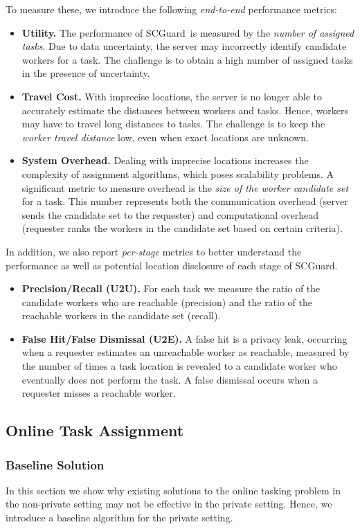 \documentclass{USC-Thesis}
\renewcommand\bf\bfseries
\newcommand{\SCG}{{SCGuard}}
\numberwithin{equation}{chapter}
\begin{document}
To measure these, we introduce the following \emph{end-to-end} performance metrics:
\begin{itemize}
\item
{\bf Utility.} The performance of \SCG\ is measured by the \emph{number of assigned tasks}.
Due to data uncertainty, the server may incorrectly identify candidate workers for a task. The challenge is to obtain a high number of assigned tasks in the presence of uncertainty.
\item
{\bf Travel Cost.} 
With imprecise locations, the server is no longer able to accurately estimate the distances between workers and tasks. Hence, workers may have to travel long distances to tasks. The challenge is to keep the \emph{worker travel distance} low, even when exact locations are unknown.
\item
{\bf System Overhead.} Dealing with imprecise locations increases the complexity of assignment algorithms, which
poses scalability problems. A significant metric to measure overhead is the \emph{size of the worker candidate set} for a task. This number represents both the communication overhead (server sends the candidate set to the requester) and computational overhead (requester ranks the workers in the candidate set based on certain criteria).
\end{itemize}

In addition, we also report \emph{per-stage} metrics to better understand the performance as well as potential location disclosure of each stage of \SCG.
\begin{itemize}
\item
{\bf Precision/Recall (U2U).} For each task we measure the ratio of the candidate workers who are reachable (precision) and the ratio of the reachable workers in the candidate set (recall).
\item
{\bf False Hit/False Dismissal (U2E).} A false hit is a privacy leak, occurring when a requester estimates an unreachable worker as reachable, measured by the number of times a task location is revealed to a candidate worker who eventually does not perform the task.
A false dismissal occurs when a requester misses a reachable worker.
\end{itemize}

\subsection{Online Task Assignment}
\label{sec:ota}
\subsubsection{Baseline Solution}
In this section we show why existing solutions to the online tasking problem in the non-private setting may not be effective in the private setting. Hence, we introduce a baseline algorithm for the private setting.
\end{document}
